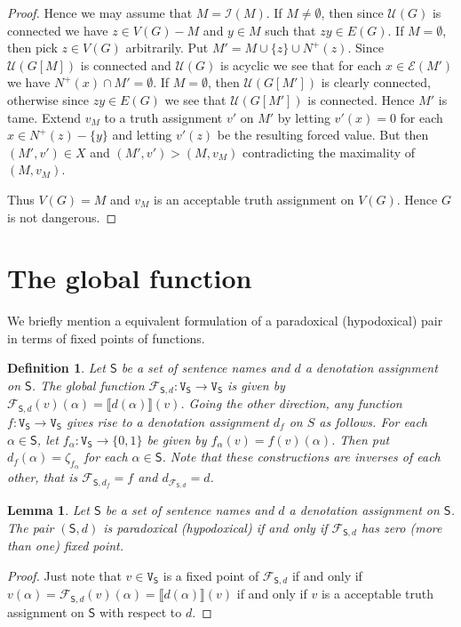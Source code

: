 \documentclass[12pt]{article}
\newtheorem{lem}[thm]{Lemma}
\newtheorem{defn}{Definition}
\theoremstyle{remark}
\newcommand{\fancy}[1]{\mathcal{#1}}
\def\S{\textsf{S}}
\def\V{\texttt{V}}
\def\F{\fancy{F}}
\def\I{\fancy{I}}
\def\U{\fancy{U}}
\def\E{\fancy{E}}
\def\F{\fancy{F}}
\begin{document}
\begin{proof}
Hence we may assume that $M = \I(M)$.  If $M \neq \emptyset$, then since $\U(G)$ is connected we have $z \in V(G) - M$ and $y \in M$ such that $zy \in E(G)$.  If $M = \emptyset$, then pick $z \in V(G)$ arbitrarily. Put $M' = M \cup \{z\} \cup N^+(z)$.  Since $\U(G[M])$ is connected and $\U(G)$ is acyclic we see that for each $x \in \E(M')$ we have $N^+(x) \cap M' = \emptyset$.  If $M = \emptyset$, then $\U(G[M'])$ is clearly connected, otherwise since $zy \in E(G)$ we see that $\U(G[M'])$ is connected.  Hence $M'$ is tame.  Extend $v_M$ to a truth assignment $v'$ on $M'$ by letting $v'(x) = 0$ for each $x \in N^+(z) - \{y\}$ and letting $v'(z)$ be the resulting forced value.  But then $(M', v') \in X$ and $(M', v') > (M, v_M)$ contradicting the maximality of $(M, v_M)$.\newline

Thus $V(G) = M$ and $v_M$ is an acceptable truth assignment on $V(G)$.  Hence $G$ is not dangerous. 
\end{proof}

\section{The global function}
\label{sec7}

We briefly mention a equivalent formulation of a paradoxical (hypodoxical) pair in terms of fixed points of functions.

\begin{defn}
Let $\S$ be a set of sentence names and $d$ a denotation assignment on $\S$. The \emph{global function} $\F_{\S, d} :\V_\S \rightarrow \V_\S$ is given by $\F_{\S, d}(v)(\alpha) = \llbracket d(\alpha) \rrbracket(v)$.  Going the other direction, any function $f: \V_\S \rightarrow \V_\S$ gives rise to a denotation assignment $d_f$ on $S$ as follows.  For each $\alpha \in \S$, let $f_{\alpha}: \V_\S \rightarrow \{0, 1\}$ be given by $f_{\alpha}(v) = f(v)(\alpha)$.  Then put $d_f(\alpha) = \zeta_{f_{\alpha}}$ for each $\alpha \in \S$.  Note that these constructions are inverses of each other, that is $\F_{\S, d_f} = f$ and $d_{\F_{\S, d}} = d$.
\end{defn}

\begin{lem}
Let $\S$ be a set of sentence names and $d$ a denotation assignment on $\S$.  The pair $(\S, d)$ is paradoxical (hypodoxical) if and only if $\F_{\S, d}$ has zero (more than one) fixed point.
\end{lem}
\begin{proof}
Just note that $v \in \V_\S$ is a fixed point of $\F_{\S, d}$ if and only if $v(\alpha) = \F_{\S, d}(v)(\alpha) = \llbracket d(\alpha) \rrbracket(v)$ if and only if $v$ is a acceptable truth assignment on $\S$ with respect to $d$.
\end{proof}
\end{document}

